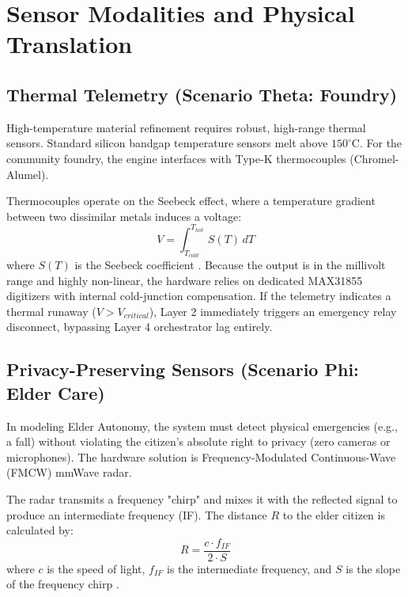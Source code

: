 \chapter{Sensor Modalities and Physical Translation}

\section{Thermal Telemetry (Scenario Theta: Foundry)}
High-temperature material refinement requires robust, high-range thermal sensors. Standard silicon bandgap temperature sensors melt above $150^\circ$C. For the community foundry, the engine interfaces with Type-K thermocouples (Chromel-Alumel). 

Thermocouples operate on the Seebeck effect, where a temperature gradient between two dissimilar metals induces a voltage:
\begin{equation}
V = \int_{T_{cold}}^{T_{hot}} S(T) \,dT
\end{equation}
where $S(T)$ is the Seebeck coefficient \cite{rowe1995crc}. Because the output is in the millivolt range and highly non-linear, the hardware relies on dedicated MAX31855 digitizers with internal cold-junction compensation. If the telemetry indicates a thermal runaway ($V > V_{critical}$), Layer 2 immediately triggers an emergency relay disconnect, bypassing Layer 4 orchestrator lag entirely.

\section{Privacy-Preserving Sensors (Scenario Phi: Elder Care)}
In modeling Elder Autonomy, the system must detect physical emergencies (e.g., a fall) without violating the citizen's absolute right to privacy (zero cameras or microphones). The hardware solution is Frequency-Modulated Continuous-Wave (FMCW) mmWave radar.

The radar transmits a frequency "chirp" and mixes it with the reflected signal to produce an intermediate frequency (IF). The distance $R$ to the elder citizen is calculated by:
\begin{equation}
R = \frac{c \cdot f_{IF}}{2 \cdot S}
\end{equation}
where $c$ is the speed of light, $f_{IF}$ is the intermediate frequency, and $S$ is the slope of the frequency chirp \cite{patole2017automotive}.

